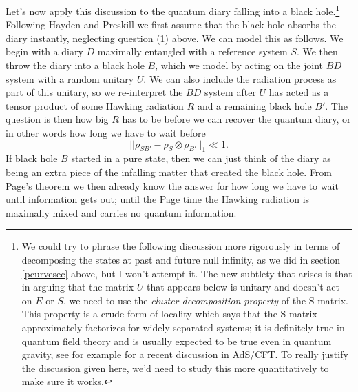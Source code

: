 \documentclass[12pt]{article}
\newcommand{\be}{\begin{equation}}
\newcommand{\ee}{\end{equation}}
\begin{document}
Let's now apply this discussion to the quantum diary falling into a black hole.\footnote{We could try to phrase the following discussion more rigorously in terms of decomposing the states at past and future null infinity, as we did in section \ref{pcurvesec} above, but I won't attempt it.  The new subtlety that arises is that in arguing that the matrix $U$ that appears below is unitary and doesn't act on $E$ or $S$, we need to use the \textit{cluster decomposition property} of the S-matrix.  This property is a crude form of locality which says that the S-matrix approximately factorizes for widely separated systems; it is definitely true in quantum field theory and is usually expected to be true even in quantum gravity, see for example \cite{Fitzpatrick:2014vua} for a recent discussion in AdS/CFT.  To really justify the discussion given here, we'd need to study this more quantitatively to make sure it works.} Following Hayden and Preskill we first assume that the black hole absorbs the diary instantly, neglecting question (1) above.  We can model this as follows.  We begin with a diary $D$ maximally entangled with a reference system $S$.  We then throw the diary into a black hole $B$, which we model by acting on the joint $BD$ system with a random unitary $U$.  We can also include the radiation process as part of this unitary, so we re-interpret the $BD$ system after $U$ has acted as a tensor product of some Hawking radiation $R$ and a remaining black hole $B'$.  The question is then how big $R$ has to be before we can recover the quantum diary, or in other words how long we have to wait before 
\be
||\rho_{SB'}-\rho_S\otimes \rho_{B'}||_1\ll 1.  
\ee
If black hole $B$ started in a pure state, then we can just think of the diary as being an extra piece of the infalling matter that created the black hole. From Page's theorem we then already know the answer for how long we have to wait until information gets out; until the Page time the Hawking radiation is maximally mixed and carries no quantum information.  
\end{document}

